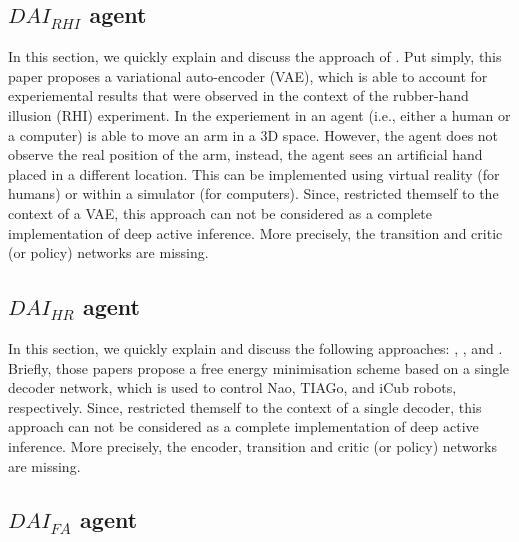 \documentclass[twoside,11pt]{article}
\begin{document}
\subsection{$DAI_{RHI}$ agent \citep{rood2020deep}}

In this section, we quickly explain and discuss the approach of \citet{rood2020deep}. Put simply, this paper proposes a variational auto-encoder (VAE), which is able to account for experiemental results that were observed in the context of the rubber-hand illusion (RHI) experiment. In the experiement in \citet{rood2020deep} an agent (i.e., either a human or a computer) is able to move an arm in a 3D space. However, the agent does not observe the real position of the arm, instead, the agent sees an artificial hand placed in a different location. This can be implemented using virtual reality (for humans) or within a simulator (for computers). Since, \citet{rood2020deep} restricted themself to the context of a VAE, this approach can not be considered as a complete implementation of deep active inference. More precisely, the transition and critic (or policy) networks are missing.

\subsection{$DAI_{HR}$ agent \citep{sancaktar2020endtoend,DAI_HR,DAI_HR2}}

In this section, we quickly explain and discuss the following approaches: \citet{sancaktar2020endtoend}, \citet{DAI_HR}, and \citet{DAI_HR2}. Briefly, those papers propose a free energy minimisation scheme based on a single decoder network, which is used to control Nao, TIAGo, and iCub robots, respectively. Since, \citet{sancaktar2020endtoend,DAI_HR,DAI_HR2} restricted themself to the context of a single decoder, this approach can not be considered as a complete implementation of deep active inference. More precisely, the encoder, transition and critic (or policy) networks are missing.

\subsection{$DAI_{FA}$ agent \citep{DAI_Kai}} \label{ssec:dai_approach}
\end{document}
